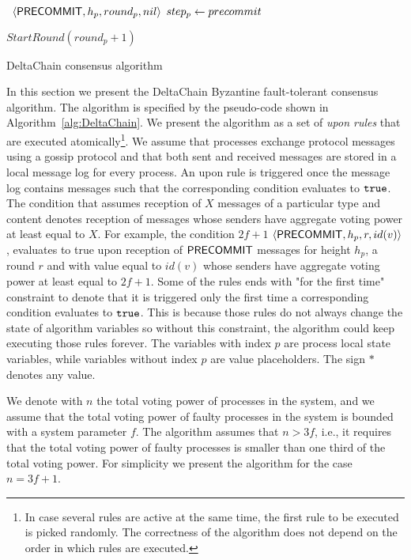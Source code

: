 \begin{algorithm}[htb!]
\begin{algorithmic}[1]
		\SHORTSPACE 
		 \label{line:tab:onTimeoutPrevote} 
			\STATE \Broadcast \ $\langle\mathsf{PRECOMMIT},h_p,round_p,nil\rangle$   
			\label{line:tab:precommit-nil-onTimeout}
			\STATE $step_p \leftarrow precommit$ 
		\ENDIF	
		\ENDFUNCTION
		
		\SHORTSPACE 
		 \label{line:tab:onTimeoutPrecommit} 
			\STATE $StartRound(round_p + 1)$ \label{line:tab:nextRound} 
		\ENDIF
		\ENDFUNCTION	
	\end{algorithmic} \caption{DeltaChain consensus algorithm}
	\label{alg:DeltaChain} 
\end{algorithm}

In this section we present the DeltaChain Byzantine fault-tolerant consensus
algorithm. The algorithm is specified by the pseudo-code shown in
Algorithm~\ref{alg:DeltaChain}. We present the algorithm as a set of \emph{upon
rules} that are executed atomically\footnote{In case several rules are active
at the same time, the first rule to be executed is picked randomly. The
correctness of the algorithm does not depend on the order in which rules are
executed.}. We assume that processes exchange protocol messages using a gossip
protocol and that both sent and received messages are stored in a local message
log for every process. An upon rule is triggered once the message log contains
messages such that the corresponding condition evaluates to $\tt{true}$. The
condition that assumes reception of $X$ messages of a particular type and
content denotes reception of messages whose senders have aggregate voting power at
least equal to $X$. For example, the condition $2f+1$ $\langle\mathsf{PRECOMMIT},h_p,r,id(v)\rangle$,  
evaluates to true upon reception of $\mathsf{PRECOMMIT}$ messages for height $h_p$, 
a round $r$ and with value equal to $id(v)$ whose senders have aggregate voting 
power at least equal to $2f+1$. Some of the rules ends with "for the first time" constraint 
to denote that it is triggered only the first time a corresponding condition evaluates 
to $\tt{true}$. This is because those rules do not always change the state of algorithm 
variables so without this constraint, the algorithm could keep 
executing those rules forever. The variables with index $p$ are process local state
variables, while variables without index $p$ are value placeholders. The sign
$*$ denotes any value.    

We denote with $n$ the total voting power of processes in the system, and we
assume that the total voting power of faulty processes in the system is bounded
with a system parameter $f$.  The algorithm assumes that $n > 3f$, i.e., it
requires that the total voting power of faulty processes is smaller than one
third of the total voting power. For simplicity we present the algorithm for
the case $n = 3f + 1$.

